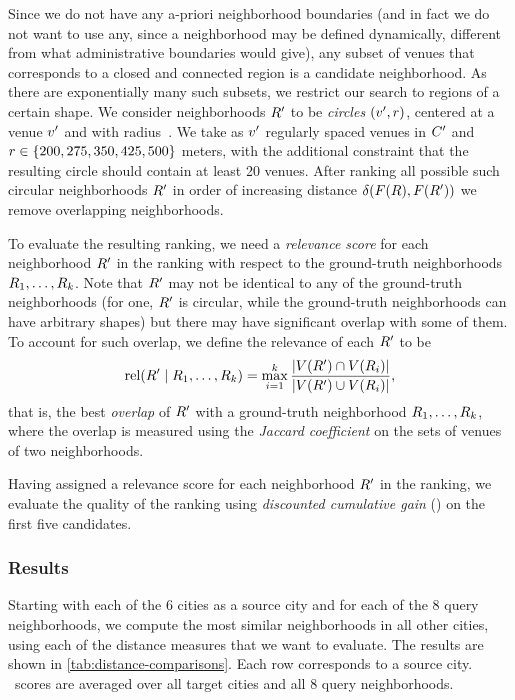 Since we do not have any a-priori neighborhood boundaries (and in fact
we do not want to use any, since a neighborhood may be defined dynamically,
different from what administrative boundaries would give),
any subset of venues that corresponds to a closed and connected region
is a candidate neighborhood. 
As there are exponentially many such subsets, we restrict our
search to regions of a certain shape. 
We consider neighborhoods ${R}'$ to be \emph{circles}
$({v}',{r})$, centered at a venue ${v}'$ and with radius~\radius.
We take as ${v}'$ regularly spaced venues in ${C}'$ and ${r}\in\{200, 275,
350, 425, 500\}$ meters, with the additional constraint that the
resulting circle should contain at least 20 venues. 
After ranking all possible such circular neighborhoods ${R}'$ in
order of increasing distance ${\delta}({F}({R}),{F}({R}'))$
we remove overlapping neighborhoods.

To evaluate the resulting ranking, we need a 
\emph{relevance score} for each neighborhood ${R}'$ in the ranking
with respect to the ground-truth neighborhoods
${R}_1,\ldots,{R}_k$. 
Note that ${R}'$ may not be identical to any of the ground-truth
neighbor\-hoods (for one, ${R}'$ is circular, while the ground-truth
neighbor\-hoods can have arbitrary shapes) but there may have
significant overlap with some of them. 
To account for such overlap, we define the relevance of each
${R}'$ to be
\[
{\mathrm{rel}}({R}' \mid {R}_1,\ldots,{R}_k) =
\max_{i=1}^{k}
\frac{|{V}({R}')\cap{V}({R}_i)|} {|{V}({R}')\cup{V}({R}_i)|},
\]
that is, the best \emph{overlap} of ${R}'$ with a 
ground-truth neighborhood ${R}_1,\ldots,{R}_k$, 
where the overlap is measured using the \emph{Jaccard coefficient} 
on the sets of venues of two neighborhoods.

Having assigned a relevance score for each neighborhood ${R}'$ in
the ranking, we evaluate the quality of the ranking using 
\emph{discounted cumulative gain} (\dcg) on the first five candidates.

\subsubsection{Results}
Starting with each of the 6 cities as a source city and for each of the 8 query
neighborhoods,  we compute the most similar neighborhoods in all other cities,
using each of the distance measures that we want to evaluate.  The results are
shown in \autoref{tab:distance-comparisons}.  Each row corresponds to a source
city.  \dcg\ scores are averaged over all target cities and all 8 query
neighborhoods.

